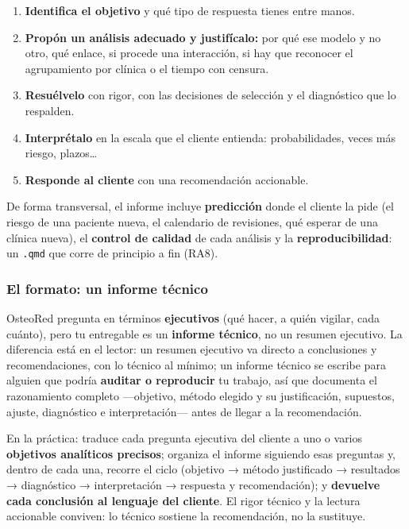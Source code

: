 \documentclass[
  letterpaper,
  DIV=11,
  numbers=noendperiod]{scrartcl}
\providecommand{\tightlist}{%
  \setlength{\itemsep}{0pt}\setlength{\parskip}{0pt}}\usepackage{longtable,booktabs,array}
\begin{document}
\begin{enumerate}
\def\labelenumi{\arabic{enumi}.}
\tightlist
\item
  \textbf{Identifica el objetivo} y qué tipo de respuesta tienes entre
  manos.
\item
  \textbf{Propón un análisis adecuado y justifícalo:} por qué ese modelo
  y no otro, qué enlace, si procede una interacción, si hay que
  reconocer el agrupamiento por clínica o el tiempo con censura.
\item
  \textbf{Resuélvelo} con rigor, con las decisiones de selección y el
  diagnóstico que lo respalden.
\item
  \textbf{Interprétalo} en la escala que el cliente entienda:
  probabilidades, veces más riesgo, plazos\ldots{}
\item
  \textbf{Responde al cliente} con una recomendación accionable.
\end{enumerate}

De forma transversal, el informe incluye \textbf{predicción} donde el
cliente la pide (el riesgo de una paciente nueva, el calendario de
revisiones, qué esperar de una clínica nueva), el \textbf{control de
calidad} de cada análisis y la \textbf{reproducibilidad}: un
\texttt{.qmd} que corre de principio a fin (RA8).

\hypertarget{el-formato-un-informe-tuxe9cnico}{%
\subsubsection{El formato: un informe
técnico}\label{el-formato-un-informe-tuxe9cnico}}

OsteoRed pregunta en términos \textbf{ejecutivos} (qué hacer, a quién
vigilar, cada cuánto), pero tu entregable es un \textbf{informe
técnico}, no un resumen ejecutivo. La diferencia está en el lector: un
resumen ejecutivo va directo a conclusiones y recomendaciones, con lo
técnico al mínimo; un informe técnico se escribe para alguien que podría
\textbf{auditar o reproducir} tu trabajo, así que documenta el
razonamiento completo ---objetivo, método elegido y su justificación,
supuestos, ajuste, diagnóstico e interpretación--- antes de llegar a la
recomendación.

En la práctica: traduce cada pregunta ejecutiva del cliente a uno o
varios \textbf{objetivos analíticos precisos}; organiza el informe
siguiendo esas preguntas y, dentro de cada una, recorre el ciclo
(objetivo → método justificado → resultados → diagnóstico →
interpretación → respuesta y recomendación); y \textbf{devuelve cada
conclusión al lenguaje del cliente}. El rigor técnico y la lectura
accionable conviven: lo técnico sostiene la recomendación, no la
sustituye.
\end{document}
